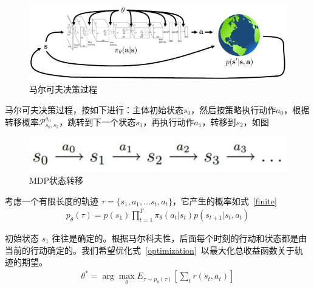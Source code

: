 \begin{figure}[!htbp]\centering
\vspace{1em}
  \includegraphics[width=0.9\linewidth]{figures/MDP.jpg}
  \caption{马尔可夫决策过程} 
  \label{fig:MDP}       %
  \vspace{1em}
\end{figure}


马尔可夫决策过程，按如下进行：主体初始状态$s_0$，然后按策略执行动作$a_0$，根据转移概率$\mathcal{P}_{s_0, s_1}^{a_0}$，跳转到下一个状态$s_1$，再执行动作$a_1$，转移到$s_2$，如图
\begin{figure}[!htbp]\centering
\vspace{1em}
  \includegraphics[width=0.9\linewidth]{figures/MDP_trans}
  \caption{MDP状态转移} 
  \label{fig:MDP}       %
  \vspace{1em}
\end{figure}

考虑一个有限长度的轨迹 $\tau=\{s_1,a_1,...s_t,a_t\}$，它产生的概率如式~\eqref{finite}~
\begin{equation}
\label{finite}
\begin{aligned}
p_\theta(\tau) = p(s_1)\prod_{t=1}^T \pi_\theta(a_t|s_t)p(s_{t+1}|s_t,a_t)
\end{aligned}
\end{equation}

初始状态 $s_1$ 往往是确定的。根据马尔科夫性，后面每个时刻的行动和状态都是由当前的行动确定的。我们希望优化式~\eqref{optimization}~以最大化总收益函数关于轨迹的期望。
\begin{equation}
\label{optimization}
\begin{aligned}
\theta^* = \arg\max_\theta E_{\tau\sim p_\theta(\tau)}[\sum_t r(s_t, a_t)]
\end{aligned}
\end{equation}


